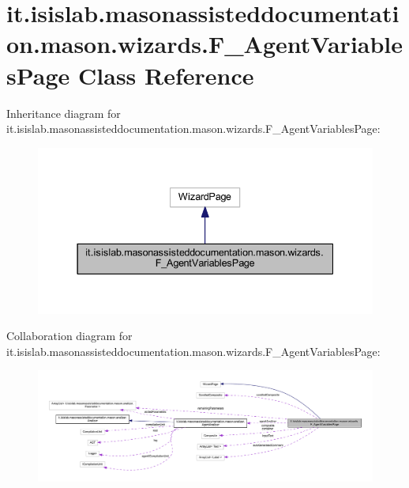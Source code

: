 \hypertarget{classit_1_1isislab_1_1masonassisteddocumentation_1_1mason_1_1wizards_1_1_f___agent_variables_page}{\section{it.\-isislab.\-masonassisteddocumentation.\-mason.\-wizards.\-F\-\_\-\-Agent\-Variables\-Page Class Reference}
\label{classit_1_1isislab_1_1masonassisteddocumentation_1_1mason_1_1wizards_1_1_f___agent_variables_page}
}


Inheritance diagram for it.\-isislab.\-masonassisteddocumentation.\-mason.\-wizards.\-F\-\_\-\-Agent\-Variables\-Page\-:\nopagebreak
\begin{figure}[H]
\begin{center}
\leavevmode
\includegraphics[width=337pt]{classit_1_1isislab_1_1masonassisteddocumentation_1_1mason_1_1wizards_1_1_f___agent_variables_page__inherit__graph}
\end{center}
\end{figure}


Collaboration diagram for it.\-isislab.\-masonassisteddocumentation.\-mason.\-wizards.\-F\-\_\-\-Agent\-Variables\-Page\-:\nopagebreak
\begin{figure}[H]
\begin{center}
\leavevmode
\includegraphics[width=350pt]{classit_1_1isislab_1_1masonassisteddocumentation_1_1mason_1_1wizards_1_1_f___agent_variables_page__coll__graph}
\end{center}
\end{figure}
